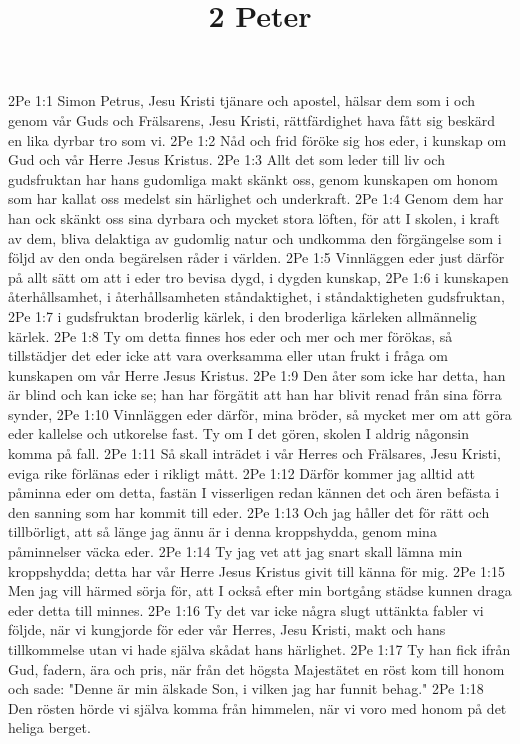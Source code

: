 

\title{2 Peter}

2Pe 1:1  Simon Petrus, Jesu Kristi tjänare och apostel, hälsar dem som i och genom vår Guds och Frälsarens, Jesu Kristi, rättfärdighet hava fått sig beskärd en lika dyrbar tro som vi.
2Pe 1:2  Nåd och frid föröke sig hos eder, i kunskap om Gud och vår Herre Jesus Kristus.
2Pe 1:3  Allt det som leder till liv och gudsfruktan har hans gudomliga makt skänkt oss, genom kunskapen om honom som har kallat oss medelst sin härlighet och underkraft.
2Pe 1:4  Genom dem har han ock skänkt oss sina dyrbara och mycket stora löften, för att I skolen, i kraft av dem, bliva delaktiga av gudomlig natur och undkomma den förgängelse som i följd av den onda begärelsen råder i världen.
2Pe 1:5  Vinnläggen eder just därför på allt sätt om att i eder tro bevisa dygd, i dygden kunskap,
2Pe 1:6  i kunskapen återhållsamhet, i återhållsamheten ståndaktighet, i ståndaktigheten gudsfruktan,
2Pe 1:7  i gudsfruktan broderlig kärlek, i den broderliga kärleken allmännelig kärlek.
2Pe 1:8  Ty om detta finnes hos eder och mer och mer förökas, så tillstädjer det eder icke att vara overksamma eller utan frukt i fråga om kunskapen om vår Herre Jesus Kristus.
2Pe 1:9  Den åter som icke har detta, han är blind och kan icke se; han har förgätit att han har blivit renad från sina förra synder,
2Pe 1:10  Vinnläggen eder därför, mina bröder, så mycket mer om att göra eder kallelse och utkorelse fast. Ty om I det gören, skolen I aldrig någonsin komma på fall.
2Pe 1:11  Så skall inträdet i vår Herres och Frälsares, Jesu Kristi, eviga rike förlänas eder i rikligt mått.
2Pe 1:12  Därför kommer jag alltid att påminna eder om detta, fastän I visserligen redan kännen det och ären befästa i den sanning som har kommit till eder.
2Pe 1:13  Och jag håller det för rätt och tillbörligt, att så länge jag ännu är i denna kroppshydda, genom mina påminnelser väcka eder.
2Pe 1:14  Ty jag vet att jag snart skall lämna min kroppshydda; detta har vår Herre Jesus Kristus givit till känna för mig.
2Pe 1:15  Men jag vill härmed sörja för, att I också efter min bortgång städse kunnen draga eder detta till minnes.
2Pe 1:16  Ty det var icke några slugt uttänkta fabler vi följde, när vi kungjorde för eder vår Herres, Jesu Kristi, makt och hans tillkommelse utan vi hade själva skådat hans härlighet.
2Pe 1:17  Ty han fick ifrån Gud, fadern, ära och pris, när från det högsta Majestätet en röst kom till honom och sade: "Denne är min älskade Son, i vilken jag har funnit behag."
2Pe 1:18  Den rösten hörde vi själva komma från himmelen, när vi voro med honom på det heliga berget.
